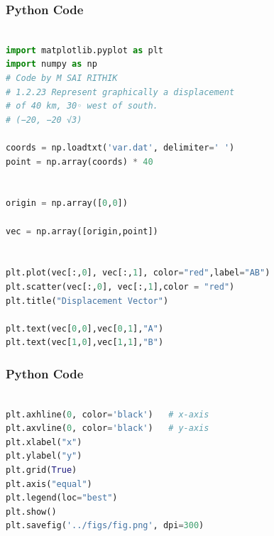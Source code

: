 \documentclass{beamer}
\begin{document}
\begin{frame}[fragile]
    \frametitle{Python Code}
    \begin{lstlisting}[language=Python]

import matplotlib.pyplot as plt
import numpy as np 
# Code by M SAI RITHIK
# 1.2.23 Represent graphically a displacement
# of 40 km, 30◦ west of south.
# (−20, −20 √3)

coords = np.loadtxt('var.dat', delimiter=' ')
point = np.array(coords) * 40


origin = np.array([0,0])

vec = np.array([origin,point])


plt.plot(vec[:,0], vec[:,1], color="red",label="AB")
plt.scatter(vec[:,0], vec[:,1],color = "red")
plt.title("Displacement Vector")

plt.text(vec[0,0],vec[0,1],"A")
plt.text(vec[1,0],vec[1,1],"B")
\end{lstlisting}
\end{frame}



\begin{frame}[fragile]
    \frametitle{Python Code}
    \begin{lstlisting}[language=Python]

plt.axhline(0, color='black')   # x-axis
plt.axvline(0, color='black')   # y-axis
plt.xlabel("x")
plt.ylabel("y")
plt.grid(True)
plt.axis("equal")
plt.legend(loc="best")
plt.show()
plt.savefig('../figs/fig.png', dpi=300)

    \end{lstlisting}
\end{frame}
\end{document}
